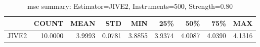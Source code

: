 \begin{table}[ht]
\centering
\caption{mse summary: Estimator=JIVE2, Instruments=500, Strength=0.80}
\begin{tabular}{lrrrrrrrr}
\toprule
 & COUNT & MEAN & STD & MIN & 25\% & 50\% & 75\% & MAX \\
\midrule
JIVE2 & 10.0000 & 3.9993 & 0.0781 & 3.8855 & 3.9374 & 4.0087 & 4.0390 & 4.1316 \\
\bottomrule
\end{tabular}
\end{table}
